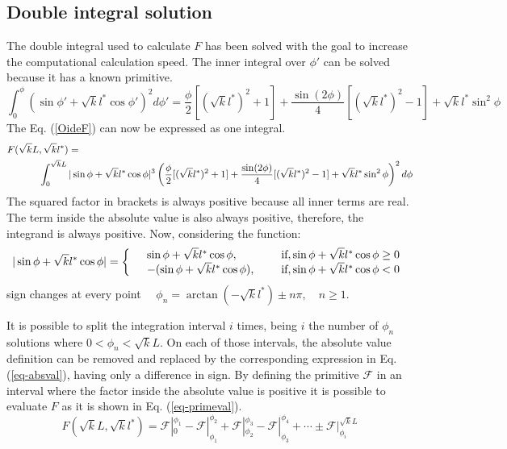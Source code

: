 \subsection{Double integral solution}
 The double integral used to calculate $F$ has been solved with the goal to increase the computational calculation speed. The inner integral over $\phi'$ can be solved because it has a known primitive.
\begin{equation}
 \int_0^\phi (\sin \phi'+ \sqrt{k}l^*\cos\phi')^2d\phi'=\frac{\phi}{2}[(\sqrt{k}l^*)^2 +1 ] + \frac{\sin(2\phi)}{4}[(\sqrt{k}l^*)^2 -1]+\sqrt{k}l^*\sin^2\phi
\end{equation}
The Eq. (\ref{OideF}) can now be expressed as one integral.
{\scriptsize
\begin{align}
F(\sqrt{k}L&,\sqrt{k}l^*) =\\
&\int_0^{ \sqrt{k}L} |\sin\phi+\sqrt{k}l^*\cos\phi|^3 \left( \frac{\phi}{2}[(\sqrt{k}l^*)^2 +1 ] + \frac{\sin(2\phi)}{4}[(\sqrt{k}l^*)^2 -1]+\sqrt{k}l^*\sin^2\phi\right)^2 d\phi\notag
\end{align}
}
The squared factor in brackets is always positive because all inner terms are real. The term inside the absolute value is also always positive, therefore, the integrand is always positive. Now, considering the function:
  \begin{equation}
  |\sin \phi + \sqrt{k}l^*\cos\phi|=\left\{
  \begin{array}{c l l}
&  \sin\phi+\sqrt{k}l^*\cos	\phi,\quad\qquad&\text{if}, \sin\phi+	\sqrt{k}l^*\cos	\phi\geq0\\
&  -(\sin\phi+\sqrt{k}l^*\cos\phi),\quad&\text{if}, \sin\phi+	\sqrt{k}l^*\cos	\phi<0
  \end{array}\right.\label{eq-absval}
 \end{equation}
sign changes at every point $\quad\phi_n = \arctan(-\sqrt{ k}l^*)\pm n\pi,\quad n\geq1$.\par
It is possible to split the integration interval $i$ times, being $i$ the number of $\phi_n$ solutions where $0<\phi_n<\sqrt{k}L$. On each of those intervals, the absolute value definition can be removed and replaced by the corresponding expression in Eq. (\ref{eq-absval}), having only a difference in sign. By defining the primitive $\mathscr{F}$ in an interval where the factor inside the absolute value is positive it is possible to evaluate $F$ as it is shown in Eq. (\ref{eq-primeval}).
\begin{equation}
 F(\sqrt{k}L,\sqrt{k}l^*)= \mathscr{F}|_0^{\phi_1} - \mathscr{F}|_{\phi_1}^{\phi_2} +  \mathscr{F}|_{\phi_2}^{\phi_3} - \mathscr{F}|_{\phi_3}^{\phi_4}+ \cdots \pm  \mathscr{F}|_{\phi_i}^{\sqrt{k}L}\label{eq-primeval}
\end{equation}
